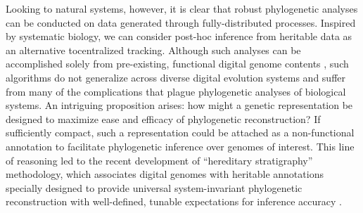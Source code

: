 Looking to natural systems, however, it is clear that robust phylogenetic analyses can be conducted on data generated through fully-distributed processes.
Inspired by systematic biology, we can consider post-hoc inference from heritable data as an alternative tocentralized tracking.
Although such analyses can be accomplished solely from pre-existing, functional digital genome contents \citep{moreno2021case}, such algorithms do not generalize across diverse digital evolution systems and suffer from many of the complications that plague phylogenetic analyses of biological systems.
An intriguing proposition arises: how might a genetic representation be designed to maximize ease and efficacy of phylogenetic reconstruction?
If sufficiently compact, such a representation could be attached as a non-functional annotation to facilitate phylogenetic inference over genomes of interest.
This line of reasoning led to the recent development of ``hereditary stratigraphy'' methodology, which associates digital genomes with heritable annotations specially designed to provide universal system-invariant phylogenetic reconstruction with well-defined, tunable expectations for inference accuracy
\citep{moreno2022hereditary}.


